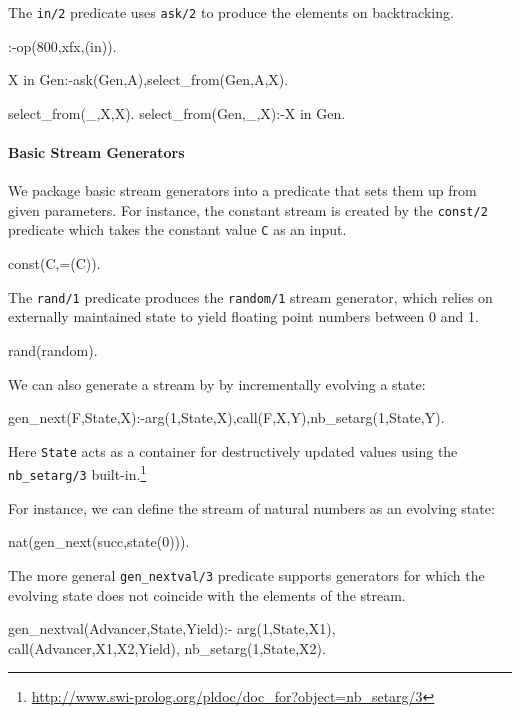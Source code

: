 \documentclass[submission,copyright,creativecommons]{eptcs}
\begin{document}
The {\tt in/2} predicate uses {\tt ask/2} to produce the elements on backtracking.
\begin{code}
:-op(800,xfx,(in)).

X in Gen:-ask(Gen,A),select_from(Gen,A,X).

select_from(_,X,X).
select_from(Gen,_,X):-X in Gen.
\end{code}

\paragraph{Basic Stream Generators}
We package basic stream generators into a predicate that sets them up from
given parameters.
For instance, the constant stream is created by the {\tt const/2} predicate
which takes the constant value {\tt C} as an input.
\begin{code}
const(C,=(C)).
\end{code}

The {\tt rand/1} predicate produces the {\tt random/1} stream generator, which relies on externally maintained state
to yield floating point numbers between 0 and 1.
\begin{code}
rand(random).
\end{code}

We can also generate a stream by by incrementally evolving a state:
\begin{code}
gen_next(F,State,X):-arg(1,State,X),call(F,X,Y),nb_setarg(1,State,Y).
\end{code}
Here {\tt State} acts as a container for destructively updated values using the
{\tt nb\_setarg/3} built-in.\footnote{\url{http://www.swi-prolog.org/pldoc/doc_for?object=nb_setarg/3}}


For instance, we can define the stream of natural numbers as an evolving state:
\begin{code}
nat(gen_next(succ,state(0))).
\end{code}

The more general {\tt gen\_nextval/3} predicate supports generators for which
the evolving state does not coincide with the elements of the stream.
\begin{code}
gen_nextval(Advancer,State,Yield):-
  arg(1,State,X1),
  call(Advancer,X1,X2,Yield),
  nb_setarg(1,State,X2).
\end{code}
\end{document}
